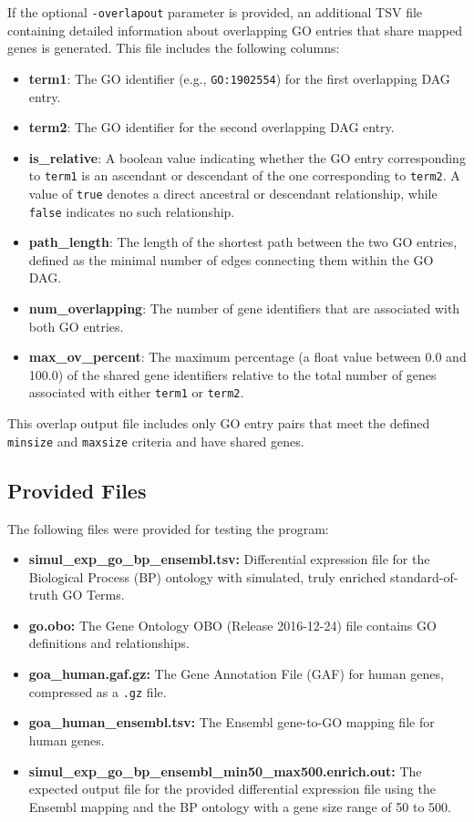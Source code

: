 \documentclass{article}
\begin{document}
    If the optional \texttt{-overlapout} parameter is provided, an additional TSV file containing detailed information about overlapping GO entries that share mapped genes is generated. This file includes the following columns:
    \begin{itemize}
        \item \textbf{term1}: The GO identifier (e.g., \texttt{GO:1902554}) for the first overlapping DAG entry.
        \item \textbf{term2}: The GO identifier for the second overlapping DAG entry.
        \item \textbf{is\_relative}: A boolean value indicating whether the GO entry corresponding to \texttt{term1} is an ascendant or descendant of the one corresponding to \texttt{term2}. A value of \texttt{true} denotes a direct ancestral or descendant relationship, while \texttt{false} indicates no such relationship.
        \item \textbf{path\_length}: The length of the shortest path between the two GO entries, defined as the minimal number of edges connecting them within the GO DAG.
        \item \textbf{num\_overlapping}: The number of gene identifiers that are associated with both GO entries.
        \item \textbf{max\_ov\_percent}: The maximum percentage (a float value between 0.0 and 100.0) of the shared gene identifiers relative to the total number of genes associated with either \texttt{term1} or \texttt{term2}.
    \end{itemize}
    This overlap output file includes only GO entry pairs that meet the defined \texttt{minsize} and \texttt{maxsize} criteria and have shared genes.

    \subsection{Provided Files}\label{subsec:provided-files}
    The following files were provided for testing the program:
    \begin{itemize}
        \item \textbf{simul\_exp\_go\_bp\_ensembl.tsv:} Differential expression file for the Biological Process (BP) ontology with simulated, truly enriched standard-of-truth GO Terms.
        \item \textbf{go.obo:} The Gene Ontology OBO (Release 2016-12-24) file contains GO definitions and relationships.
        \item \textbf{goa\_human.gaf.gz:} The Gene Annotation File (GAF) for human genes, compressed as a \texttt{.gz} file.
        \item \textbf{goa\_human\_ensembl.tsv:} The Ensembl gene-to-GO mapping file for human genes.
        \item \textbf{simul\_exp\_go\_bp\_ensembl\_min50\_max500.enrich.out:} The expected output file for the provided differential expression file using the Ensembl mapping and the BP ontology with a gene size range of 50 to 500.
    \end{itemize}
\end{document}
